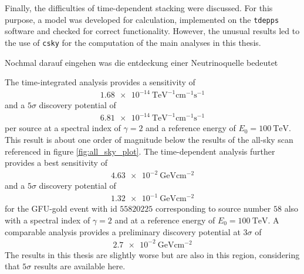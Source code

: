 Finally, the difficulties of time-dependent stacking were discussed.
For this purpose, a model was developed for calculation, implemented on the \texttt{tdepps} software and checked for correct functionality.
However, the unusual results led to the use of \texttt{csky} for the computation of the main analyses in this thesis.

Nochmal darauf eingehen was die entdeckung einer Neutrinoquelle bedeutet

The time-integrated analysis provides a sensitivity of
\begin{align}
  \SI{1.68e-14}{\tera\electronvolt\tothe{-1}\centi\meter\tothe{-1}\second\tothe{-1}}
\end{align}
and a $\num{5}\sigma$ discovery potential of
\begin{align}
  \SI{6.81e-14}{\tera\electronvolt\tothe{-1}\centi\meter\tothe{-1}\second\tothe{-1}}
\end{align}
per source at a spectral index of $\gamma=\num{2}$ and a reference energy of $E_0=\SI{100}{\tera\electronvolt}$.
This result is about one order of magnitude below the results of the all-sky scan \cite{all_sky_paper} referenced in figure \ref{fig:all_sky_plot}.
The time-dependent analysis further provides a best sensitivity of
\begin{align}
  \SI{4.63e-2}{\giga\electronvolt\centi\meter\tothe{-2}}
\end{align}
and a $\num{5}\sigma$ discovery potential of
\begin{align}
  \SI{1.32e-1}{\giga\electronvolt\centi\meter\tothe{-2}}
\end{align}
for the GFU-gold event with id $\num{55820225}$ corresponding to source number $\num{58}$ also with a spectral index of $\gamma=2$ and at a reference energy of $E_0=\SI{100}{\tera\electronvolt}$.
A comparable analysis \cite{martina} provides a preliminary discovery potential at $\num{3}\sigma$ of
\begin{align}
  \SI{2.7e-2}{\giga\electronvolt\centi\meter\tothe{-2}}
\end{align}
The results in this thesis are slightly worse but are also in this region, considering that $\num{5}\sigma$ results are available here.

